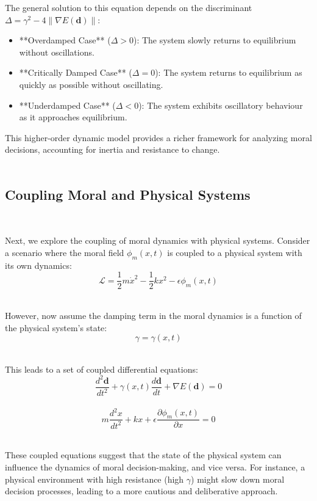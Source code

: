 \documentclass{article}
\begin{document}
The general solution to this equation depends on the discriminant \( \Delta = \gamma^2 - 4\lVert \nabla E(\mathbf{d}) \rVert \):

\begin{itemize}
  \item **Overdamped Case** (\( \Delta > 0 \)): The system slowly returns to equilibrium without oscillations.
  \item **Critically Damped Case** (\( \Delta = 0 \)): The system returns to equilibrium as quickly as possible without oscillating.
  \item **Underdamped Case** (\( \Delta < 0 \)): The system exhibits oscillatory behaviour as it approaches equilibrium.
\end{itemize}

This higher-order dynamic model provides a richer framework for analyzing moral decisions, accounting for inertia and resistance to change.
\\
\\
\subsection{Coupling Moral and Physical Systems}
\

Next, we explore the coupling of moral dynamics with physical systems. Consider a scenario where the moral field \( \phi_m(x, t) \) is coupled to a physical system with its own dynamics:
\
\[
\mathcal{L} = \frac{1}{2} m \dot{x}^2 - \frac{1}{2} k x^2 - \epsilon \phi_m(x, t)
\]
\

However, now assume the damping term in the moral dynamics is a function of the physical system’s state:
\
\[
\gamma = \gamma(x, t)
\]
\

This leads to a set of coupled differential equations:
\
\[
\frac{d^2\mathbf{d}}{dt^2} + \gamma(x, t) \frac{d\mathbf{d}}{dt} + \nabla E(\mathbf{d}) = 0
\]
\\
\[
m \frac{d^2 x}{dt^2} + kx + \epsilon \frac{\partial \phi_m(x, t)}{\partial x} = 0
\]
\

These coupled equations suggest that the state of the physical system can influence the dynamics of moral decision-making, and vice versa. For instance, a physical environment with high resistance (high \( \gamma \)) might slow down moral decision processes, leading to a more cautious and deliberative approach.
\

\

\

\

\
\end{document}
